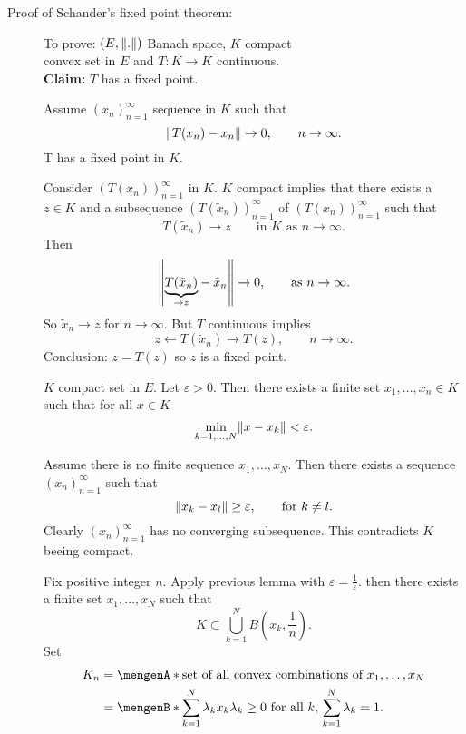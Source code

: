 \begin{description}
	\item[Proof of Schander's fixed point theorem:]
	To prove: $(E, \norm{.})$ Banach space, $K$ compact \\ convex set in $E$ and $T: K \to K$ continuous. \\
	\textbf{Claim:} \text{    }     $T$ has a fixed point. \\
	\begin{beweis}
		\begin{lemma*}
			Assume $(x_n)_{n=1}^{\infty}$ sequence in $K$ such that
			\[
				\norm{T(x_n)-x_n} \to 0, \qquad  n \to \infty.
			\]
			T has a fixed point in $K$.
		\end{lemma*}
		\begin{beweis}
			Consider $(T(x_n))_{n=1}^{\infty}$ in $K$. $K$ compact implies that there exists a $z \in K$ and a subsequence $(T(\tilde x_n))_{n=1}^{\infty}$ of $(T(x_n))_{n=1}^{\infty}$ such that 
			\[
				T(\tilde x_n) \to  z \qquad  \text{in $K$ as }n \to \infty.
			\]
			Then
			\[
				\norm{\underset{\to z}{\underbrace{T(\tilde x_n)}}- \tilde x_n} \to 0, \qquad \text{as }n \to \infty.
			\]
			So $\tilde x_n \to z$ for $n \to \infty$. But $T$ continuous implies 
			\[
				z \leftarrow T( \tilde x_n) \to T(z), \qquad  n \to \infty.
			\]
			Conclusion: $z = T(z)$ so $z$ is a fixed point.
		\end{beweis}
		\begin{lemma*}
			$K$ compact set in $E$. Let $\varepsilon >0$. Then there exists a finite set $x_1,\dots,x_n \in K$ such that for all $x \in K$
			\[
				\min\limits_{k = 1, \dots, N} \norm{x- x_k} < \varepsilon.
			\] 
		\end{lemma*}
		\begin{beweis}
			Assume there is no finite sequence $x_1, \dots, x_N$. Then there exists a sequence $(x_n)_{n=1}^{\infty}$ such that
			\[
				\norm{x_k-x_l} \geq \varepsilon, \qquad \text{for }k \neq l.
			\]
			Clearly $(x_n)_{n=1}^{\infty}$ has no converging subsequence. This contradicts $K$ beeing compact.
		\end{beweis}
		Fix positive integer $n$. Apply previous lemma with $\varepsilon = \frac{1}{\varepsilon}$. then there exists a finite set $x_1,\dots,x_N$ such that
		\[
			K \subset \bigcup_{k=1}^N B \left(x_k, \frac{1}{n} \right).
		\]
		Set 
		\begin{align*}
			K_n  &= \set{\text{set of all convex combinations of $x_1, \dots,x_N$}} \\
			&= \set[\sum_{k=1}^{N} \lambda_k x_k]{\lambda_k \geq 0 \text{ for all }k,\, \sum_{k=1}^{N}\lambda_k = 1}.

\end{align*}
\end{beweis}
\end{description}
